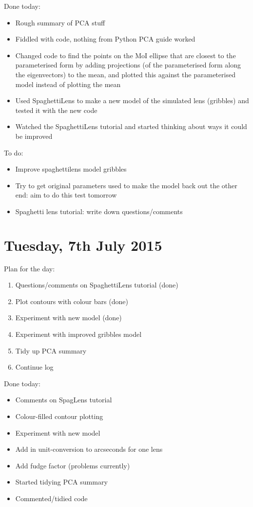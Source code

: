 \documentclass{article}
\begin{document}
\noindent Done today:
\begin{itemize}
  \item Rough summary of PCA stuff
  \item Fiddled with code, nothing from Python PCA guide worked
  \item Changed code to find the points on the MoI ellipse that are closest to the parameterised form by adding projections (of the parameterised form along the eigenvectors) to the mean, and plotted this against the parameterised model instead of plotting the mean
  \item Used SpaghettiLens to make a new model of the simulated lens (gribbles) and tested it with the new code
  \item Watched the SpaghettiLens tutorial and started thinking about ways it could be improved
\end{itemize}

\noindent To do:
\begin{itemize}
  \item Improve spaghettilens model gribbles
  \item Try to get original parameters used to make the model back out the other end: aim to do this test tomorrow
  \item Spaghetti lens tutorial: write down questions/comments
\end{itemize}\newpage

\section{Tuesday, 7th July 2015}
\noindent Plan for the day:
\begin{enumerate}
  \item Questions/comments on SpaghettiLens tutorial (done)
  \item Plot contours with colour bars (done)
  \item Experiment with new model (done)
  \item Experiment with improved gribbles model
  \item Tidy up PCA summary
  \item Continue log
\end{enumerate}

\noindent Done today:
\begin{itemize}
  \item Comments on SpagLens tutorial
  \item Colour-filled contour plotting
  \item Experiment with new model
  \item Add in unit-conversion to arcseconds for one lens
  \item Add fudge factor (problems currently)
  \item Started tidying PCA summary
  \item Commented/tidied code
\end{itemize}
\end{document}
